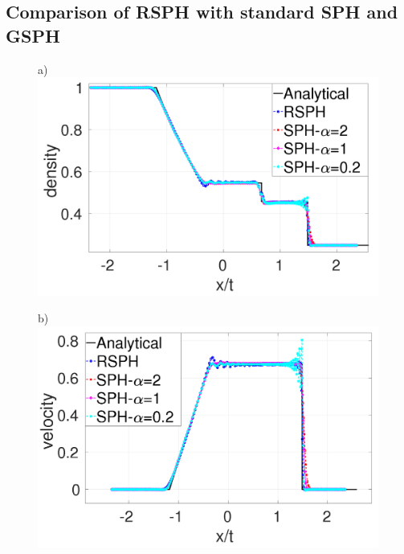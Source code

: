 \documentclass[review]{elsarticle}
\begin{document}
\subsection{Comparison of RSPH with standard SPH and GSPH}
\begin{figure}[H]
    \centering
    \begin{minipage}{.495\textwidth}
        \centering a)
        \includegraphics[width=0.99 \textwidth,height=0.7\textwidth]{./Figures/RCM-Sod-SPH-alf-rho}
    \end{minipage}%
    \begin{minipage}{.495 \textwidth}
        \centering b)
        \includegraphics[width=0.99 \textwidth,height=0.7\textwidth]{./Figures/RCM-Sod-SPH-alf-v}
    \end{minipage}%
    \\

\end{figure}
\end{document}
